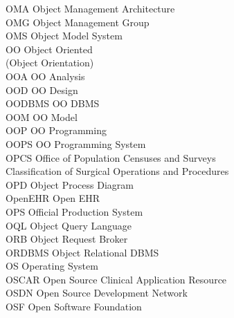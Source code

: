 \begin{tabbing}
    \>OMA \>\>Object Management Architecture\\

    \>OMG \>\>Object Management Group\\

    \>OMS \>\>Object Model System\\

    \>OO \>\>Object Oriented\\
        \>\>\>(Object Orientation)\\

    \>OOA \>\>OO Analysis\\

    \>OOD \>\>OO Design\\

    \>OODBMS \>\>OO DBMS\\

    \>OOM \>\>OO Model\\

    \>OOP \>\>OO Programming\\

    \>OOPS \>\>OO Programming System\\

    \>OPCS \>\>Office of Population Censuses and Surveys\\
        \>\>\>Classification of Surgical Operations and Procedures\\

    \>OPD \>\>Object Process Diagram\\

    \>OpenEHR \>\>Open EHR\\

    \>OPS \>\>Official Production System\\

    \>OQL \>\>Object Query Language\\

    \>ORB \>\>Object Request Broker\\

    \>ORDBMS \>\>Object Relational DBMS\\

    \>OS \>\>Operating System\\

    \>OSCAR \>\>Open Source Clinical Application Resource\\

    \>OSDN \>\>Open Source Development Network\\

    \>OSF \>\>Open Software Foundation\\


\end{tabbing}
